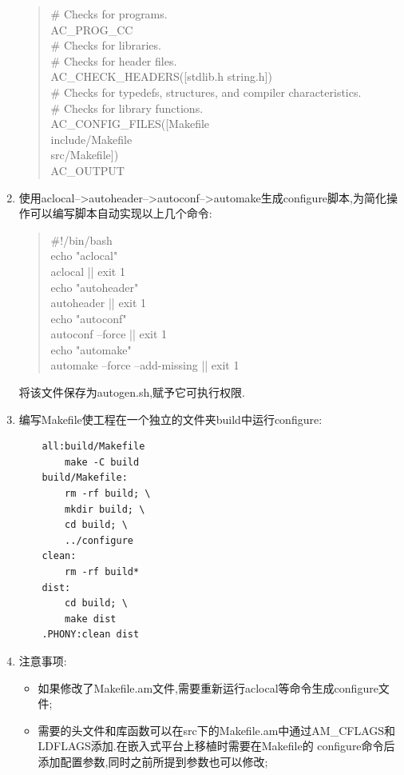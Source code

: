 \documentclass[12pt,a4paper,titlepage]{article}
\begin{document}
\begin{enumerate}
\begin{quote}
\# Checks for programs.\\
AC\_PROG\_CC\\
\# Checks for libraries.\\
\# Checks for header files.\\
AC\_CHECK\_HEADERS([stdlib.h string.h])\\
\# Checks for typedefs, structures, and compiler characteristics.\\
\# Checks for library functions.\\
AC\_CONFIG\_FILES([Makefile\\
include/Makefile\\
src/Makefile])\\
AC\_OUTPUT
\end{quote}
\item 使用aclocal-->autoheader-->autoconf-->automake生成configure脚本,为简化操作可以编写脚本自动实现以上几个命令:
\begin{quote}
\#!/bin/bash\\
echo "aclocal"\\
aclocal || exit 1\\
echo "autoheader"\\
autoheader || exit 1\\
echo "autoconf"\\
autoconf --force || exit 1\\
echo "automake"\\
automake --force --add-missing || exit 1
\end{quote}
将该文件保存为autogen.sh,赋予它可执行权限.
\item 编写Makefile使工程在一个独立的文件夹build中运行configure:
\begin{verbatim}
    all:build/Makefile
        make -C build
    build/Makefile:
        rm -rf build; \
        mkdir build; \
        cd build; \
        ../configure
    clean:
        rm -rf build*
    dist:
        cd build; \
        make dist
    .PHONY:clean dist
\end{verbatim}
\item 注意事项:
\begin{itemize}
\item 如果修改了Makefile.am文件,需要重新运行aclocal等命令生成configure文件;
\item 需要的头文件和库函数可以在src下的Makefile.am中通过AM\_CFLAGS和LDFLAGS添加.在嵌入式平台上移植时需要在Makefile的
configure命令后添加配置参数,同时之前所提到参数也可以修改;
\end{itemize}
\end{enumerate}
\end{document}

